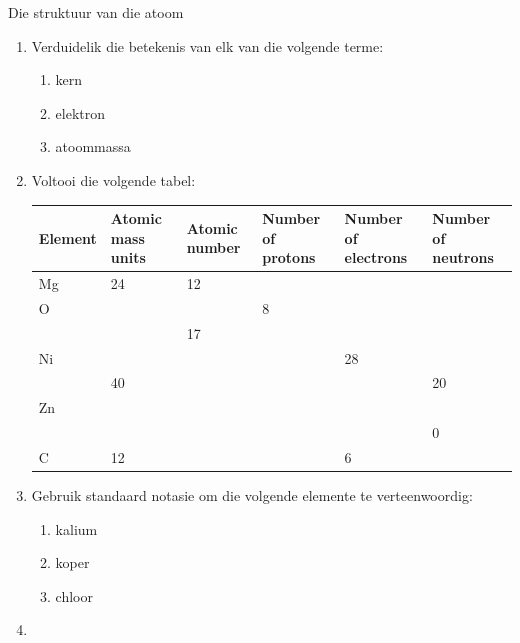 \begin{exercises}{Die struktuur van die atoom} \noindent
      \label{m38745*id256225}\begin{enumerate}[noitemsep, label=\textbf{\arabic*}. ] 
            \label{m38745*uid15}\item Verduidelik die betekenis van elk van die volgende terme:
\label{m38745*id256240}\begin{enumerate}[noitemsep, label=\textbf{\alph*}. ] 
            \label{m38745*uid16}\item kern
\label{m38745*uid17}\item elektron
\label{m38745*uid18}\item atoommassa
\end{enumerate}
                \label{m38745*uid19}\item Voltooi die volgende tabel:
\begin{center} 
\begin{tabular}{|p{1.4cm}|p{1.4cm}|p{1.4cm}|p{1.4cm}|p{1.4cm}|p{1.4cm}|}\hline
\textbf{Element} & \textbf{Atomic mass units} & \textbf{Atomic number} & \textbf{Number of protons} & \textbf{Number of electrons} & \textbf{Number of neutrons}\\\hline
Mg & 24 & 12 & & & \\\hline
O & & & 8 & & \\\hline
 & & 17 & & & \\\hline
Ni & & & & 28 & \\\hline
 & 40 & & & & 20 \\\hline
Zn & & & & & \\\hline
 & & & & & 0 \\\hline
C & 12 & & & 6 & \\\hline 
\end{tabular}
\end{center}
    \par
          \label{m38745*uid20}\item Gebruik standaard notasie om die volgende elemente te verteenwoordig:
\label{m38745*id256772}\begin{enumerate}[noitemsep, label=\textbf{\alph*}. ] 
            \label{m38745*uid21}\item kalium
\label{m38745*uid22}\item koper
\label{m38745*uid23}\item chloor
\end{enumerate}
                \label{m38745*uid24}\item 

\end{enumerate}
\end{exercises}
